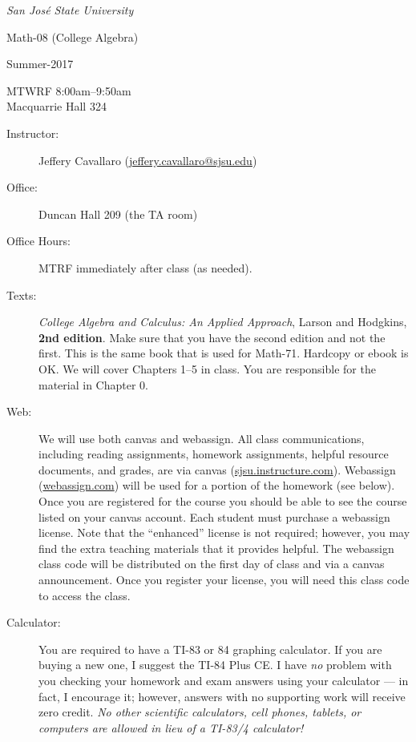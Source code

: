 \documentclass[letterpaper,12pt,fleqn]{article}
\begin{document}
\begin{center}
\emph{San Jos\'{e} State University}

\Large{Math-08 (College Algebra)}\normalsize

\large{Summer-2017}\normalsize

MTWRF 8:00am--9:50am \\

Macquarrie Hall 324
\end{center}

\vspace{0.5in}

\begin{description}

\item[Instructor:] Jeffery Cavallaro (\url{jeffery.cavallaro@sjsu.edu})

\item[Office:] Duncan Hall 209 (the TA room)

\item[Office Hours:] MTRF immediately after class (as needed).

\item[Texts:] \emph{College Algebra and Calculus: An Applied Approach},
  Larson and Hodgkins, \textbf{2nd edition}.  Make sure that you have the second edition
  and not the first. This is the same book that is used for Math-71. Hardcopy or ebook is
  OK. We will cover Chapters 1--5 in class. You are responsible for the material in
  Chapter 0.

\item[Web:] We will use both canvas and webassign. All class communications,
  including reading assignments, homework assignments, helpful resource
  documents, and grades, are via canvas (\url{sjsu.instructure.com}). Webassign
  (\url{webassign.com}) will be used for a portion of the homework (see below).
  Once you are registered for the course you should be able to see the course
  listed on your canvas account. Each student must purchase a webassign
  license. Note that the ``enhanced'' license is not required; however, you
  may find the extra teaching materials that it provides helpful. The
  webassign class code will be distributed on the first day of class and via
  a canvas announcement. Once you register your license, you will need this
  class code to access the class.

\item[Calculator:] You are required to have a TI-83 or 84 graphing calculator.
  If you are buying a new one, I suggest the TI-84 Plus CE. I have \emph{no}
  problem with you checking your homework and exam answers using your calculator --- in
  fact, I encourage it; however, answers with no supporting work will receive zero credit.
  \emph{No other scientific calculators, cell phones, tablets, or computers
    are allowed in lieu of a TI-83/4 calculator!}


\end{description}
\end{document}
